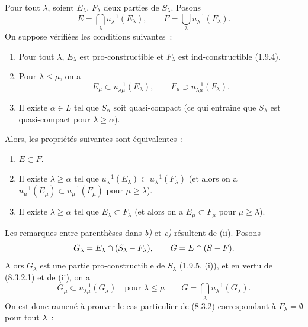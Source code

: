 \begin{theorem}[8.3.2]
\label{IV.8.3.2-fr}
Pour tout $\lambda$, soient $E_\lambda$, $F_\lambda$ deux parties de
$S_\lambda$. Posons
\begin{equation}
E=\bigcap_\lambda u_\lambda^{-1}(E_\lambda),\qquad
F=\bigcup_\lambda u_\lambda^{-1}(F_\lambda).
\tag{8.3.2.1}\label{IV.8.3.2.1-fr}
\end{equation}
On suppose vérifiées les conditions suivantes~:
\begin{enumerate}
\item[\textup{(i)}] Pour tout $\lambda$, $E_\lambda$ est pro-constructible et
$F_\lambda$ est ind-constructible \textup{(1.9.4)}.
\item[\textup{(ii)}] Pour $\lambda\leq\mu$, on a
\[
E_\mu\subset u_{\lambda\mu}^{-1}(E_\lambda),\qquad
F_\mu\supset u_{\lambda\mu}^{-1}(F_\lambda).
\]
\item[\textup{(iii)}] Il existe $\alpha\in L$ tel que $S_\alpha$ soit quasi-compact
\textup{(ce qui entraîne que $S_\lambda$ est quasi-compact pour
$\lambda\geq\alpha$)}.
\end{enumerate}
Alors, les propriétés suivantes sont équivalentes~:
\begin{enumerate}
\item[\emph{a)}] $E\subset F$.
\item[\emph{b)}] Il existe $\lambda\geq\alpha$ tel que
$u_\lambda^{-1}(E_\lambda)\subset u_\lambda^{-1}(F_\lambda)$ \textup{(et alors on a
$u_\mu^{-1}(E_\mu)\subset u_\mu^{-1}(F_\mu)$ pour $\mu\geq\lambda$)}.
\item[\emph{c)}] Il existe $\lambda\geq\alpha$ tel que
$E_\lambda\subset F_\lambda$ \textup{(et alors on a $E_\mu\subset F_\mu$ pour
$\mu\geq\lambda$)}.
\end{enumerate}
\end{theorem}

Les remarques entre parenthèses dans \emph{b)} et \emph{c)} résultent de (ii).
Posons
\[
G_\lambda=E_\lambda\cap(S_\lambda- F_\lambda),\qquad
G=E\cap(S- F).
\]
Alors $G_\lambda$ est une partie pro-constructible de $S_\lambda$ (1.9.5,
(i)), et en vertu de (8.3.2.1) et de (ii), on a
\[
G_\mu\subset u_{\lambda\mu}^{-1}(G_\lambda)
\quad\text{pour }\lambda\leq\mu
\qquad
G=\bigcap_\lambda u_\lambda^{-1}(G_\lambda).
\]
On est donc ramené à prouver le cas particulier de (8.3.2) correspondant à
$F_\lambda=\emptyset$ pour tout $\lambda$~:


